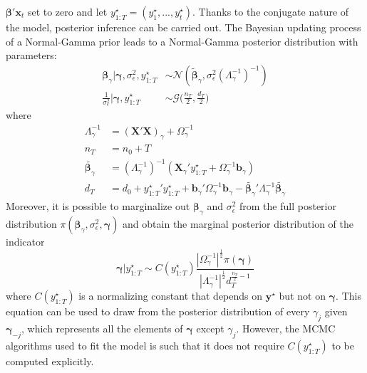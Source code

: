\documentclass[
  12pt,
]{book}
\theoremstyle{break}
\theoremstyle{nonumberplain}
\begin{document}
\(\boldsymbol{\beta}'\boldsymbol{x}_{t}\) set to zero and let
\(y_{1:T}^{\star}=(y_{1}^{\star},...,y_{t}^{\star})\). Thanks to the
conjugate nature of the model, posterior inference can be carried out.
The Bayesian updating process of a Normal-Gamma prior leads to a
Normal-Gamma posterior distribution with parameters: \begin{align*}
\boldsymbol{\beta}_{\gamma}|\boldsymbol{\gamma},\sigma^{2}_{\epsilon},y_{1:T}^{\star} & \sim \mathcal{N}( \tilde{\boldsymbol{\beta}}_{\gamma},\sigma^{2}_{\epsilon}(\Lambda_{\gamma}^{-1})^{-1}) \\
\frac{1}{\sigma_{\epsilon}^{2}}|\boldsymbol{\gamma},y_{1:T}^{\star} & \sim \mathcal{G}\bigg(\frac{n_T}{2},\frac{d_T}{2}\bigg)
\end{align*} where \begin{align*}
\Lambda_{\gamma}^{-1} & =(\boldsymbol{X}'\boldsymbol{X})_{\gamma}+\Omega_{\gamma}^{-1} \\
n_{T} & = n_{0} + T \\
\tilde{\boldsymbol{\beta}_{\gamma}} & =(\Lambda_{\gamma}^{-1})^{-1}(\boldsymbol{X}_{\gamma}'y_{1:T}^{\star}+\Omega_{\gamma}^{-1}\boldsymbol{b}_{\gamma}) \\
d_{T} & =d_{0}+{y_{1:T}^{\star}}' y_{1:T}^{\star}+ \boldsymbol{b}_{\gamma}'\Omega_{\gamma}^{-1}\boldsymbol{b}_{\gamma}-\tilde{\boldsymbol{\beta}_{\gamma}}'\Lambda_{\gamma}^{-1}\tilde{\boldsymbol{\beta}_{\gamma}}
\end{align*} Moreover, it is possible to marginalize out
\(\boldsymbol{\beta}_{\gamma}\) and \(\sigma^{2}_{\epsilon}\) from the
full posterior distribution
\(\pi(\boldsymbol{\beta}_{\gamma},\sigma^{2}_{\epsilon},\boldsymbol{\gamma})\)
and obtain the marginal posterior distribution of the indicator
\begin{equation*}
\boldsymbol{\gamma}|y_{1:T}^{\star} \sim C(y_{1:T}^{\star})\frac{|\Omega^{-1}_{\gamma}|^{\frac{1}{2}}\pi(\boldsymbol{\gamma})}{|\Lambda^{-1}_{\gamma}|^{\frac{1}{2}}d_{T}^{\frac{n_{T}}{2}-1}}
\end{equation*} where \(C(y_{1:T}^{\star})\) is a normalizing constant
that depends on \(\boldsymbol{y}^\star\) but not on
\(\boldsymbol{\gamma}\). This equation can be used to draw from the
posterior distribution of every \(\gamma_{j}\) given
\(\boldsymbol{\gamma}_{-j}\), which represents all the elements of
\(\boldsymbol{\gamma}\) except \(\gamma_{j}\). However, the MCMC
algorithms used to fit the model is such that it does not require
\(C(y_{1:T}^{\star})\) to be computed explicitly.
\end{document}
